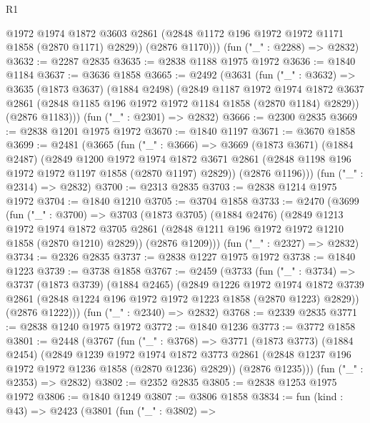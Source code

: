 \begin{lexlean}{R1}
\begin{coremodule}
          @1972
          @1974
          @1872
          @3603
          @2861
          (@2848 @1172 @196 @1972 @1972 @1171 @1858 (@2870 @1171) @2829))
        (@2876 @1170)))
    (fun ("_" : @2288) => @2832)
@3632 := @2287 @2835
@3635 := @2838 @1188 @1975 @1972
@3636 := @1840 @1184
@3637 := @3636 @1858
@3665 := @2492
    (@3631
      (fun ("_" : @3632) =>
      @3635
        (@1873 @3637)
        (@1884 @2498)
        (@2849
          @1187
          @1972
          @1974
          @1872
          @3637
          @2861
          (@2848 @1185 @196 @1972 @1972 @1184 @1858 (@2870 @1184) @2829))
        (@2876 @1183)))
    (fun ("_" : @2301) => @2832)
@3666 := @2300 @2835
@3669 := @2838 @1201 @1975 @1972
@3670 := @1840 @1197
@3671 := @3670 @1858
@3699 := @2481
    (@3665
      (fun ("_" : @3666) =>
      @3669
        (@1873 @3671)
        (@1884 @2487)
        (@2849
          @1200
          @1972
          @1974
          @1872
          @3671
          @2861
          (@2848 @1198 @196 @1972 @1972 @1197 @1858 (@2870 @1197) @2829))
        (@2876 @1196)))
    (fun ("_" : @2314) => @2832)
@3700 := @2313 @2835
@3703 := @2838 @1214 @1975 @1972
@3704 := @1840 @1210
@3705 := @3704 @1858
@3733 := @2470
    (@3699
      (fun ("_" : @3700) =>
      @3703
        (@1873 @3705)
        (@1884 @2476)
        (@2849
          @1213
          @1972
          @1974
          @1872
          @3705
          @2861
          (@2848 @1211 @196 @1972 @1972 @1210 @1858 (@2870 @1210) @2829))
        (@2876 @1209)))
    (fun ("_" : @2327) => @2832)
@3734 := @2326 @2835
@3737 := @2838 @1227 @1975 @1972
@3738 := @1840 @1223
@3739 := @3738 @1858
@3767 := @2459
    (@3733
      (fun ("_" : @3734) =>
      @3737
        (@1873 @3739)
        (@1884 @2465)
        (@2849
          @1226
          @1972
          @1974
          @1872
          @3739
          @2861
          (@2848 @1224 @196 @1972 @1972 @1223 @1858 (@2870 @1223) @2829))
        (@2876 @1222)))
    (fun ("_" : @2340) => @2832)
@3768 := @2339 @2835
@3771 := @2838 @1240 @1975 @1972
@3772 := @1840 @1236
@3773 := @3772 @1858
@3801 := @2448
    (@3767
      (fun ("_" : @3768) =>
      @3771
        (@1873 @3773)
        (@1884 @2454)
        (@2849
          @1239
          @1972
          @1974
          @1872
          @3773
          @2861
          (@2848 @1237 @196 @1972 @1972 @1236 @1858 (@2870 @1236) @2829))
        (@2876 @1235)))
    (fun ("_" : @2353) => @2832)
@3802 := @2352 @2835
@3805 := @2838 @1253 @1975 @1972
@3806 := @1840 @1249
@3807 := @3806 @1858
@3834 := fun (kind : @43) =>
  @2423
    (@3801
      (fun ("_" : @3802) =>

\end{coremodule}
\end{lexlean}
